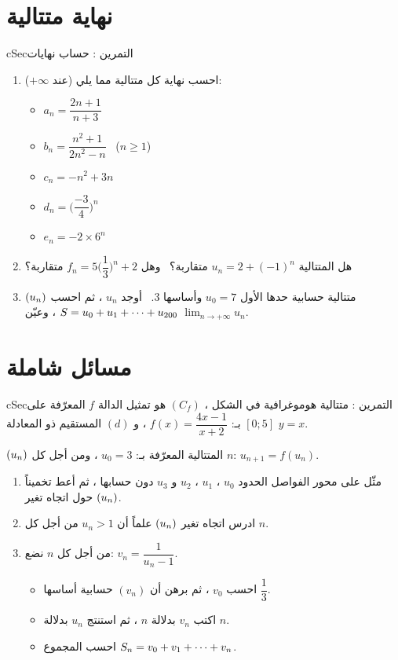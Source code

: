 \documentclass[12pt,a4paper]{article}
\newenvironment{BOX}[2]{\begin{otherlanguage}{english}\begin{arbox}{#1}{#2}}{\end{arbox}\end{otherlanguage}}
\newcounter{exo}
\newenvironment{tamrin}[1]{\stepcounter{exo}\begin{BOX}{cSec}{التمرين \theexo: #1}}{\end{BOX}}
\renewcommand{\cdots}{\mathinner{\cdotp\cdotp\cdotp}}
\newcommand{\limn}{\displaystyle\lim_{n\to+\infty}}
\newenvironment{sq}{\begin{itemize}[leftmargin=2.4em,itemsep=3pt]}{\end{itemize}}
\newcommand{\qa}{\item[(أ)]}\newcommand{\qb}{\item[(ب)]}\newcommand{\qc}{\item[(جـ)]}\newcommand{\qd}{\item[(د)]}\newcommand{\qe}{\item[(هـ)]}
\begin{document}
\section{نهاية متتالية}
\begin{tamrin}{حساب نهايات}
\begin{enumerate}
\item احسب نهاية كل متتالية مما يلي (عند $+\infty$):
\begin{sq}
\qa $a_n=\dfrac{2n+1}{n+3}$
\qb $b_n=\dfrac{n^2+1}{2n^2-n}$ \ ($n\ge1$)
\qc $c_n=-n^2+3n$
\qd $d_n=\Big(\dfrac{-3}{4}\Big)^n$
\qe $e_n=-2\times6^n$
\end{sq}
\item هل المتتالية $u_n=2+(-1)^n$ متقاربة؟ \ وهل $f_n=5\Big(\dfrac13\Big)^n+2$ متقاربة؟
\item $(u_n)$ متتالية حسابية حدها الأول $u_0=7$ وأساسها $3$. \ أوجد $u_n$ ، ثم احسب $S=u_0+u_1+\cdots+u_{200}$ ، وعيّن $\limn u_n$.
\end{enumerate}
\end{tamrin}

\section{مسائل شاملة}
\begin{tamrin}{متتالية هوموغرافية}
في الشكل ، $(C_f)$ هو تمثيل الدالة $f$ المعرّفة على $[0;5]$ بـ: $f(x)=\dfrac{4x-1}{x+2}$ ، و $(d)$ المستقيم ذو المعادلة $y=x$.\par
$(u_n)$ المتتالية المعرّفة بـ: $u_0=3$ ، ومن أجل كل $n$: $u_{n+1}=f(u_n)$.
\begin{enumerate}
\item مثّل على محور الفواصل الحدود $u_0$ ، $u_1$ ، $u_2$ و $u_3$ دون حسابها ، ثم أعط تخميناً حول اتجاه تغير $(u_n)$.
\item ادرس اتجاه تغير $(u_n)$ علماً أن $u_n>1$ من أجل كل $n$.
\item من أجل كل $n$ نضع: $v_n=\dfrac{1}{u_n-1}$.
\begin{sq}
\qa احسب $v_0$ ، ثم برهن أن $(v_n)$ حسابية أساسها $\dfrac13$.
\qb اكتب $v_n$ بدلالة $n$ ، ثم استنتج $u_n$ بدلالة $n$.
\qc احسب المجموع $S_n=v_0+v_1+\cdots+v_n$.
\end{sq}
\end{enumerate}
\end{tamrin}
\end{document}
